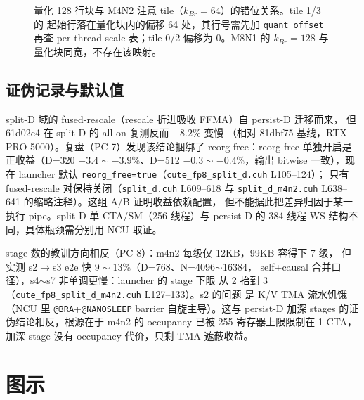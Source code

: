 \begin{figure}[H]
\caption{量化 128 行块与 M4N2 注意 tile（$k_{Br}{=}64$）的错位关系。tile 1/3 的
起始行落在量化块内的偏移 64 处，其行号需先加 \texttt{quant\_offset} 再查 per-thread
scale 表；tile 0/2 偏移为 0。M8N1 的 $k_{Br}{=}128$ 与量化块同宽，不存在该映射。}
\label{fig:30-quant-align}
\end{figure}

\subsection{证伪记录与默认值}

split-D 域的 fused-rescale（rescale 折进吸收 FFMA）自 persist-D 迁移而来，
但 61d02c4 在 split-D 的 all-on 复测反而 $+8.2\%$ 变慢
（相对 81dbf75 基线，RTX PRO 5000）。复盘（PC-7）发现该结论捆绑了
reorg-free：reorg-free
单独开启是正收益（D=320 $-3.4\sim-3.9\%$、D=512
$-0.3\sim-0.4\%$，输出 bitwise 一致），现在 launcher 默认
\texttt{reorg\_free=true}（\texttt{cute\_fp8\_split\_d.cuh} L105--124）；
只有 fused-rescale 对保持关闭（\texttt{split\_d.cuh} L609--618 与
\texttt{split\_d\_m4n2.cuh} L638--641 的缩略注释）。这组 A/B 证明收益依赖配置，
但不能据此把差异归因于某一执行 pipe。split-D 单 CTA/SM（256 线程）与
persist-D 的 384 线程 WS 结构不同，具体瓶颈需分别用 NCU 取证。

stage 数的教训方向相反（PC-8）：m4n2 每级仅 12KB，99KB 容得下 7 级，
但实测 s2$\to$s3 e2e 快 $9\sim13\%$（D=768、N=4096$\sim$16384，
self+causal 合并口径），s4$\sim$s7 非单调更慢：launcher 的 stage 下限
从 2 抬到 3（\texttt{cute\_fp8\_split\_d\_m4n2.cuh} L127--133）。s2 的问题
是 K/V TMA 流水饥饿（NCU 里 \texttt{@BRA}+\texttt{@NANOSLEEP} barrier
自旋主导）。这与 persist-D 加深 stages 的证伪结论相反，根源在于
m4n2 的 occupancy 已被 255 寄存器上限限制在 1 CTA，加深 stage 没有 occupancy
代价，只剩 TMA 遮蔽收益。

\section{图示}

